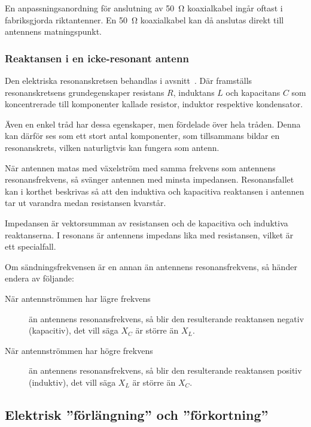 En anpassningsanordning för anslutning av \qty{50}{\ohm} koaxialkabel ingår
oftast i fabriksgjorda riktantenner.
En \qty{50}{\ohm} koaxialkabel kan då anslutas direkt till antennens
matningspunkt.

\subsubsection{Reaktansen i en icke-resonant antenn}

Den elektriska resonanskretsen behandlas i avsnitt~.
Där framställs resonanskretsens grundegenskaper resistans \(R\),
induktans \(L\) och kapacitans \(C\) som koncentrerade till komponenter kallade
resistor, induktor respektive kondensator.

Även en enkel tråd har dessa egenskaper, men fördelade över hela tråden.
Denna kan därför ses som ett stort antal komponenter, som tillsammans bildar en
resonanskrets, vilken naturligtvis kan fungera som antenn.

När antennen matas med växelström med samma frekvens som antennens
resonansfrekvens, så svänger antennen med minsta impedansen.
Resonansfallet kan i korthet beskrivas så att den induktiva och kapacitiva
reaktansen i antennen tar ut varandra medan resistansen kvarstår.

Impedansen är vektorsumman av resistansen och de kapacitiva och
induktiva reaktanserna.
I resonans är antennens impedans lika med resistansen, vilket är ett
specialfall.

Om sändningsfrekvensen är en annan än antennens resonansfrekvens, så händer
endera av följande:

\begin{description}
\item[När antennströmmen har lägre frekvens] än antennens resonansfrekvens, så blir
den resulterande reaktansen negativ (kapacitiv), det vill säga \(X_C\) är större
än \(X_L\).

\item[När antennströmmen har högre frekvens] än antennens resonansfrekvens,
så blir den resulterande reaktansen positiv (induktiv), det vill säga \(X_L\)
är större än \(X_C\).
\end{description}


\subsection{Elektrisk ''förlängning'' och ''förkortning''}
\label{elektrisk förlängning}

